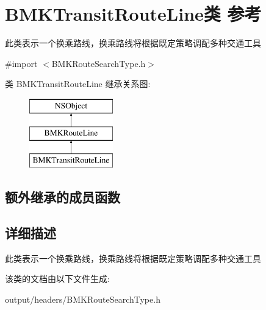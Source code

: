 \hypertarget{interface_b_m_k_transit_route_line}{}\section{B\+M\+K\+Transit\+Route\+Line类 参考}
\label{interface_b_m_k_transit_route_line}


此类表示一个换乘路线，换乘路线将根据既定策略调配多种交通工具  




{\ttfamily \#import $<$B\+M\+K\+Route\+Search\+Type.\+h$>$}

类 B\+M\+K\+Transit\+Route\+Line 继承关系图\+:\begin{figure}[H]
\begin{center}
\leavevmode
\includegraphics[height=3.000000cm]{interface_b_m_k_transit_route_line}
\end{center}
\end{figure}
\subsection*{额外继承的成员函数}


\subsection{详细描述}
此类表示一个换乘路线，换乘路线将根据既定策略调配多种交通工具 

该类的文档由以下文件生成\+:\begin{DoxyCompactItemize}
\item 
output/headers/B\+M\+K\+Route\+Search\+Type.\+h\end{DoxyCompactItemize}
